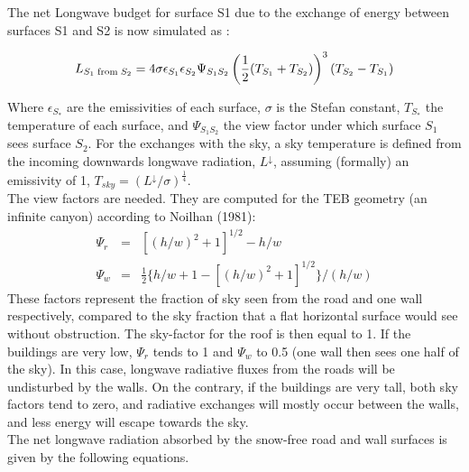 The net Longwave budget for surface S1 due to the exchange of energy between surfaces S1 and S2 is now simulated as :

\begin{equation}
L_{S_1\; {\rm from} \; S_2} = 4 \sigma \epsilon_{S_1} \epsilon_{S_2} \Psi_{S_1S_2}\left(\frac{1}{2}(T_{S_1}+T_{S_2})\right)^3 \left(T_{S_2}-T_{S_1}\right)
\end{equation}

Where $\epsilon_{S_*}$ are the emissivities of each surface, $\sigma$ is the Stefan constant, $T_{S_*}$ the temperature of each surface, and $
\Psi_{S_1S_2}$ the view factor under which surface $S_1$ sees surface $S_2$. For the exchanges with the sky, a sky temperature is defined from the incoming downwards longwave radiation, $L^\downarrow$, assuming (formally) an emissivity of 1, $T_{sky} = \left(L^\downarrow/\sigma\right)^\frac{1}{4}$.\\

The view factors are needed.
They are computed for the TEB geometry (an infinite
canyon) according to Noilhan (1981)\nocite{Noilhan1981}:
\begin{eqnarray}
\Psi_r&=&[(h/w)^2+1]^{1/2}-h/w\\
\Psi_w&=&\frac{1}{2}\{h/w+1-[(h/w)^2+1]^{1/2}\}/(h/w)
\end{eqnarray}
These factors represent the fraction of sky seen from the road and
one wall respectively, compared
to the sky fraction that a flat horizontal surface would see
without obstruction. The sky-factor
for the roof is then equal to 1. If the buildings are very low, $\Psi_r$ tends
to 1 and $\Psi_w$ to 0.5 (one wall then sees one half of the sky).
In this case, longwave radiative fluxes from the roads
will be undisturbed by the walls. On the contrary, if the
buildings are very tall, both sky factors tend to zero, and radiative exchanges
will mostly occur between the walls, and less energy will escape towards
the sky.
\\

The net longwave radiation absorbed by the snow-free road and wall surfaces is given by the following equations. 

